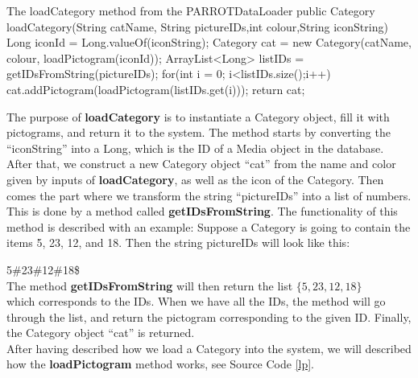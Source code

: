 \begin{source}[{lc}]{The loadCategory method from the PARROTDataLoader}
	public Category loadCategory(String catName, String pictureIDs,int colour,String iconString)
	{
		Long iconId = Long.valueOf(iconString);
		Category cat = new Category(catName, colour, loadPictogram(iconId));
		ArrayList<Long> listIDs = getIDsFromString(pictureIDs);
		for(int i = 0; i<listIDs.size();i++)
		{
			cat.addPictogram(loadPictogram(listIDs.get(i)));
		}
		return cat;
	}
\end{source}

The purpose of \textbf{loadCategory} is to instantiate a Category object, fill it with pictograms, and return it to the system.
The method starts by converting the ``iconString'' into a Long, which is the ID of a Media object in the database.\newline
After that, we construct a new Category object ``cat'' from the name and color given by inputs of \textbf{loadCategory}, as well as the icon of the Category.
Then comes the part where we transform the string ``pictureIDs'' into a list of numbers.
This is done by a method called \textbf{getIDsFromString}.
The functionality of this method is described with an example:
Suppose a Category is going to contain the items 5, 23, 12, and 18. Then the string pictureIDs will look like this:\newline

5\#23\#12\#18\$\\

The method \textbf{getIDsFromString} will then return the list\newline
\begin{math}
	\{5,23,12,18\}
\end{math}
\\
which corresponds to the IDs.\newline
When we have all the IDs, the method will go through the list, and return the pictogram corresponding to the given ID.
Finally, the Category object ``cat'' is returned.\newline
\\
After having described how we load a Category into the system, we will described how the \textbf{loadPictogram} method works, see Source Code \ref{lp}.

